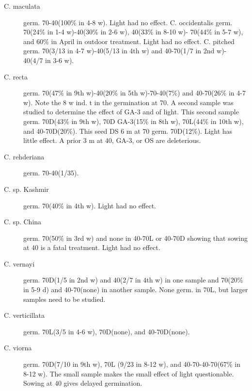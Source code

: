 \begin{description}
\item [C. maculata] germ. 70-40(100\% in 4-8 w). Light had no effect.
C. occidentalis germ. 70(24\% in 1-4 w)-40(30\% in 2-6 w), 40(33\% in 8-10 w)-
70(44\% in 5-7 w), and 60\% in April in outdoor treatment. Light had no effect.
C. pitched germ. 70(3/13 in 4-7 w)-40(5/13 in 4th w) and 40-70(1/7 in 2nd w)-
40(4/7 in 3-6 w).
\item [C. recta] germ. 70(47\% in 9th w)-40(20\% in 5th w)-70-40(7\%) and 40-70(26\% in
4-7 w). Note the 8 w ind. t in the germination at 70. A second sample was studied to
determine the effect of GA-3 and of light. This second sample germ. 70D(43\% in 9th
w), 70D GA-3(15\% in 8th w), 70L(44\% in 10th w), and 40-70D(20\%). This seed DS 6
m at 70 germ. 70D(12\%). Light has little effect. A prior 3 m at 40, GA-3, or OS are
deleterious.
\item [C. rehderiana] germ. 70-40(1/35).
\item [C. sp. Kashmir] germ. 70(40\% in 4th w). Light had no effect.
\item [C. sp. China] germ. 70(50\% in 3rd w) and none in 40-70L or 40-70D showing
that sowing at 40 is a fatal treatment. Light had no effect.
\item [C. vernayi] germ. 70D(1/5 in 2nd w) and 40(2/7 in 4th w) in one sample and
70(20\% in 5-9 d) and 40-70(none) in another sample. None germ. in 70L, but larger
samples need to be studied.
\item [C. verticillata] germ. 70L(3/5 in 4-6 w), 70D(none), and 40-70D(none).
\item [C. viorna] germ. 70D(7/10 in 9th w), 70L (9/23 in 8-12 w), and 40-70-40-70(67\%
in 8-12 w). The small sample makes the small effect of light questionable. Sowing at
40 gives delayed germination.


\end{description}
